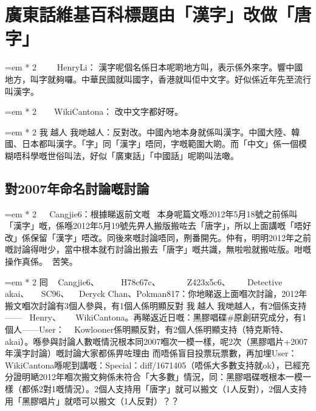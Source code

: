 

\newcommand{\ladder}[2]{%
  \par\noindent
  \begingroup
    \leftskip=\dimexpr #1em * 2\relax
    #2\par
  \endgroup
}

\chapter{廣東話維基百科標題由「漢字」改做「唐字」}

\ladder{0}{  HenryLi：
漢字呢個名係日本呢啲地方叫，表示係外來字。響中國地方，叫字就夠囉。中華民國就叫國字，香港就叫佢中文字。好似係近年先至流行叫漢字。}

\ladder{1}{ WikiCantona：
改中文字都好呀。}

\ladder{2}{我越人 我哋越人：反對改。中國內地本身就係叫漢字。中國大陸、韓國、日本都叫漢字。「字」同「漢字」唔同，字嘅範圍大啲。而「中文」係一個模糊唔科學嘅世俗叫法，好似「廣東話」「中國話」呢啲叫法噉。}

\section{對2007年命名討論嘅討論}

\ladder{0}{󴅙 Cangjie6：根據睇返前文嘅，本身呢篇文喺2012年5月18號之前係叫「漢字」嘅，係喺2012年5月19號先畀人搬版搬咗去「唐字」，所以上面講嘅「唔好改」係保留「漢字」唔改。同後來嘅討論唔同，𠝹番開先。仲有，明明2012年之前嘅討論得咁少，當中根本就冇討論出搬去「唐字」嘅共識，無啦啦就搬咗版。咁嘅操作真係。󲇩，苦笑。}

\ladder{1}{囘󴅙 Cangjie6、 H78c67c、𠄡 Z423x5c6、󱢙 Detective  akai、 SC96、 Deryck Chan、Pokman817：你地睇返上面嗰次討論，2012年搬文嗰次討論有3個人參與，有1個人係明顯反對 我越人 我哋越人，有2個係支持—— Henry、 WikiCantona。再睇返近日嘅\lr{言}{}：黑膠唱碟\#原創研究成分，有1個人——User： Kowlooner係明顯反對，有2個人係明顯支持（特克斯特、󱢙  akai）。喺參與討論人數嘅情況根本同2007嗰次一模一樣，呢2次（黑膠唱片+2007年漢字討論）嘅討論大家都係畀咗理由 而唔係盲目投票玩票數，再加埋User： WikiCantona喺呢到講嘅：Special：diff/1671405（唔係大多數支持就ok），已經充分證明嗮2012年嗰次搬文夠係未符合「大多數」情況，同\lr{言}{}：黑膠唱碟嘅根本一模一樣（都係2對1嘅情況）。2個人支持用「唐字」就可以搬文（1人反對），2個人支持用「黑膠唱片」就唔可以搬文（1人反對）？？}

